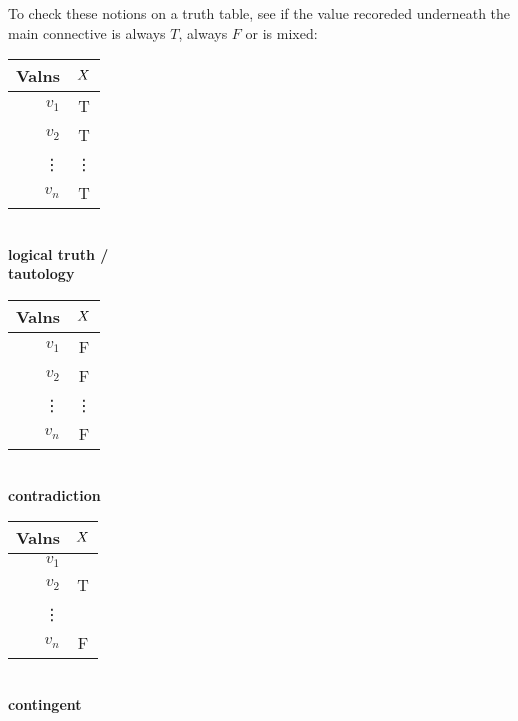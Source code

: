 




\begin{highlighted}
		To check these notions on a truth table, see if the value recoreded underneath the main connective is always $T$, always $F$ or is mixed:
		
	\begin{center}
		\begin{minipage}{.3\linewidth}
			\begin{center}
				\begin{tabular}{r | c}
					Valns & $X$\\
					\hline
					$v_1$&T\\
					$v_2$  & T \\
					\vdots & \vdots \\
					$v_n$ & T \\
				\end{tabular}\\ \textbf{logical truth /} \\
				\textbf{tautology}
			\end{center}
		\end{minipage}
		\begin{minipage}{.35\linewidth}
			\begin{center}
				\begin{tabular}{r | c}
					Valns & $X$\\
					\hline
					$v_1$&F\\
					$v_2$  & F \\
					\vdots & \vdots \\
					$v_n$ & F\\
				\end{tabular}\\ \textbf{contradiction}
			\end{center}
		\end{minipage}
		\begin{minipage}{.3\linewidth}
			\begin{center}
				\begin{tabular}{r | c}
					Valns & $X$\\
					\hline
					$v_1$&\\
					$v_2$  & T \\
					\vdots &  \\
					$v_n$ &F \\
				\end{tabular}\\ \textbf{contingent}
			\end{center}
		\end{minipage}
	\end{center}
	
	
\end{highlighted}

